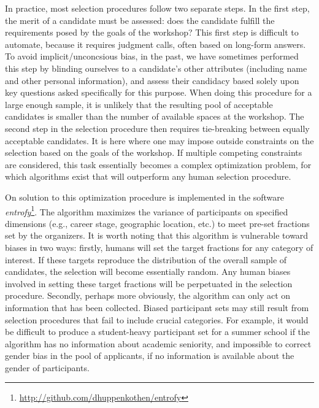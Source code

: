 In practice, most selection procedures follow two separate steps. In the first step, the merit of a candidate must be assessed: does the candidate fulfill the requirements posed by the goals of the workshop?
This first step is difficult to automate, because it requires judgment calls, often based on long-form answers.
To avoid implicit/unconcsious bias, in the past, we have sometimes performed this step by blinding ourselves to a candidate's other attributes (including name and other personal information), and assess their candidacy based solely upon key questions asked specifically for this purpose.
When doing this procedure for a large enough sample, it is unlikely that the resulting pool of acceptable candidates is smaller than the number of available spaces at the workshop.
The second step in the selection procedure then requires tie-breaking between equally acceptable candidates.
It is here where one may impose outside constraints on the selection based on the goals of the workshop.
If multiple competing constraints are considered, this task essentially becomes a complex optimization problem, for which algorithms exist that will outperform any human selection procedure.

On solution to this optimization procedure is implemented in the software \textit{entrofy}\footnote{\url{http://github.com/dhuppenkothen/entrofy}}. The algorithm maximizes the variance of participants on specified dimensions (e.g., career stage, geographic location, etc.) to meet pre-set fractions set by the organizers.
It is worth noting that this algorithm is vulnerable toward biases in two ways: firstly, humans will set the target fractions for any category of interest.
If these targets reproduce the distribution of the overall sample of candidates, the selection will become essentially random.
Any human biases involved in setting these target fractions will be perpetuated in the selection procedure.
Secondly, perhaps more obviously, the algorithm can only act on information that has been collected.
Biased participant sets may still result from selection procedures that fail to include crucial categories. For example, it would be difficult to produce a student-heavy participant set for a summer school if the algorithm has no information about academic seniority, and impossible to correct gender bias in the pool of applicants, if no information is available about the gender of participants.
